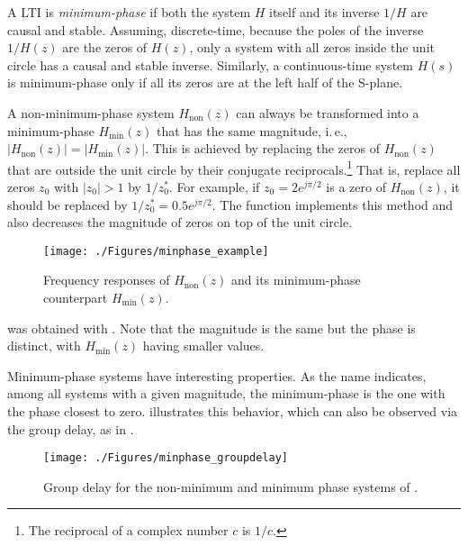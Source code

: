 A LTI is \emph{minimum-phase} if both the system $H$ itself and its inverse $1/H$ are causal and stable. Assuming, discrete-time, because the poles of the inverse $1/H(z)$ are the zeros of $H(z)$, only a system with all zeros inside the unit circle has a causal and stable inverse. Similarly, a continuous-time system $H(s)$ is minimum-phase only if all its zeros are at the left half of the S-plane.

A non-minimum-phase system $H_{\textrm{non}}(z)$ can always be transformed into a minimum-phase $H_{\textrm{min}}(z)$ that has the same magnitude, i.\,e., $|H_{\textrm{non}}(z)| = |H_{\textrm{min}}(z)|$. This is achieved by replacing the zeros of $H_{\textrm{non}}(z)$ that are outside the unit circle by their conjugate reciprocals.\footnote{The reciprocal of a complex number $c$ is $1/c$.} That is, replace all zeros $z_0$ with $|z_0|>1$ by $1/z_0^*$.
For example, if $z_0=2 e^{j \pi/2}$ is a zero of $H_{\textrm{non}}(z)$, it should be replaced by $1/z_0^* = 0.5 e^{j \pi/2}$.
The function  implements this method and also decreases the magnitude of zeros on top of the unit circle.

\begin{figure}
\centering
\texttt{[image: ./Figures/minphase\_example]}
\caption{Frequency responses of $H_{\textrm{non}}(z)$ and its minimum-phase counterpart $H_{\textrm{min}}(z)$.\label{fig:minphase_example}}
\end{figure}




 was obtained with .
Note that the magnitude is the same but the phase is distinct, with $H_{\textrm{min}}(z)$ having smaller values.

Minimum-phase systems have interesting properties. As the name indicates, among all systems with a given magnitude, the minimum-phase is the one with the phase closest to zero.  illustrates this behavior, which can also be observed via the group delay, as in
.

\begin{figure}
\centering
\texttt{[image: ./Figures/minphase\_groupdelay]}
\caption{Group delay for the non-minimum and minimum phase systems of .\label{fig:minphase_groupdelay}}
\end{figure}

